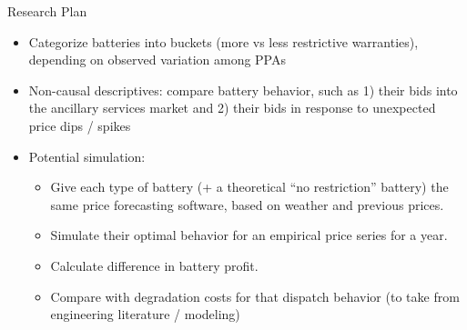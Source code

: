 \documentclass{beamer}
\begin{document}
\begin{frame}{Research Plan}
    \begin{itemize}
        \item Categorize batteries into buckets (more vs less restrictive warranties), depending on observed variation among PPAs
        \item Non-causal descriptives: compare battery behavior, such as 1) their bids into the ancillary services market and 2) their bids in response to unexpected price dips / spikes 
        \item Potential simulation:
        \begin{itemize}
            \item Give each type of battery (+ a theoretical “no restriction” battery) the same price forecasting software, based on weather and previous prices.
            \item Simulate their optimal behavior for an empirical price series for a year. 
            \item Calculate difference in battery profit.
            \item Compare with degradation costs for that dispatch behavior (to take from engineering literature / modeling)
        \end{itemize}
    \end{itemize}
\end{frame}
\end{document}
